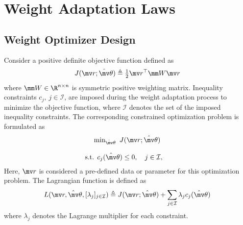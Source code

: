 \documentclass[lettersize,journal]{IEEEtran}
\newcommand*{\fe}{\mv r}
\newcommand*{\wth}{\mv\theta}
\begin{document}
\section{Weight Adaptation Laws}\label{sec:adap_laws}

\subsection{Weight Optimizer Design}

Consider a positive definite objective function defined as 
\begin{equation}
    J(\fe;\hat\wth)\triangleq 
    \tfrac{1}{2} \fe^\top  \mm W\fe
\end{equation}
where $\mm W\in\R^{n\times n}$ is symmetric positive weighting matrix.
Inequality constraints $c_j,\ j\in\mathcal{I}$, are imposed during the weight adaptation process to minimize the objective function, where $\mathcal I$ denotes the set of the imposed inequality constraints. 
The corresponding constrained optimization problem is formulated as
\begin{equation}
    \begin{matrix}
        \min_{\hat\wth} \ J(\fe;\hat\wth)
        \\ \\
        \begin{aligned}
        \text{s.t. }&c_{j}(\hat\wth) 
        \le0, \quad j\in\mathcal{I},
        \end{aligned}
    \end{matrix}
    \label{eq. train obj}
\end{equation}
Here, $\fe$ is considered a pre-defined data or parameter for this optimization problem. The Lagrangian function is defined as
\begin{equation}
    L(
        \fe,\hat\wth,[\lambda_j]_{j\in\mathcal I}
    ) 
    \triangleq 
    J(\fe;\hat\wth) 
    + 
    \sum_{j\in\mathcal I}
    \lambda_{j}
    c_{j}(\hat\wth)
\end{equation}
where $\lambda_j$ denotes the Lagrange multiplier for each constraint.
\end{document}
